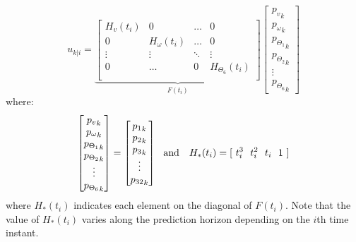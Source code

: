 \begin{equation}
{u}_{k|i}=\underbrace{\left[ \begin{matrix}
H_v(t_i)          & 0 & \dots      & 0  \\
0 &     H_\omega(t_i)      & \dots      & 0  \\
\vdots     & \vdots     & \ddots     & \vdots      \\
0 & \dots      & 0 &   H_{\Theta_6}(t_i)         \\
\end{matrix} \right]}_{F(t_i)} \left[ \begin{matrix} {p_v}_k \\ {p_{\omega}}_k \\ {p_{\Theta_1}}_k \\ {p_{\Theta_2}}_k \\ \vdots \\ {p_{\Theta_6}}_k \end{matrix} \right]
\end{equation}
where: 
\begin{equation}
\left[ \begin{matrix} {p_v}_k \\ {p_{\omega}}_k \\ {{p}_{\Theta_1}}_k \\ {{p}_{\Theta_2}}_k \\ \vdots \\ {{p}_{\Theta_6}}_k \end{matrix} \right] = \left[ \begin{matrix} {p_1}_k \\ {p_2}_k \\ {p_3}_k \\ \vdots \\ {p_{32}}_k \end{matrix} \right]\ \ \textnormal{and }\ \ H_*(t_i)=[\ t_i^3\ \ t_i^2\ \ t_i\ \ 1\ ]
\end{equation}
where $H_*(t_i)$ indicates each element on the diagonal of $F(t_i)$. Note that the value of $H_*(t_i)$ varies along the prediction horizon depending on the $i$th time instant. 

